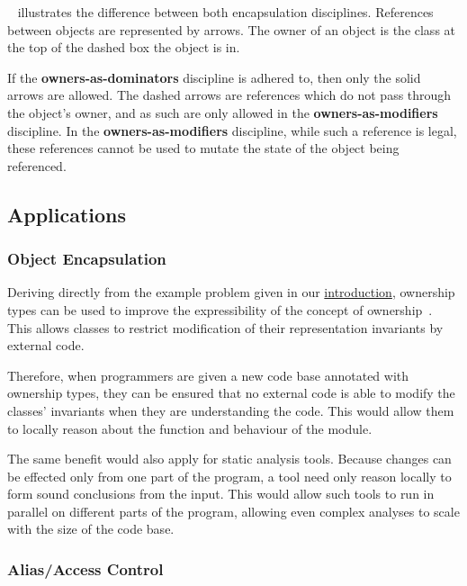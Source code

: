 \documentclass{acm_proc_article-sp}
\begin{document}
~\cite{dietl09gut} illustrates the
difference between both encapsulation disciplines. References between objects
are represented by arrows. The owner of an object is the class at the top of
the dashed box the object is in.

If the \textbf{owners-as-dominators} discipline is adhered to, then only the
solid arrows are allowed. The dashed arrows are references which do not pass
through the object's owner, and as such are only allowed in the
\textbf{owners-as-modifiers} discipline. In the \textbf{owners-as-modifiers}
discipline, while such a reference is legal, these references cannot be used to
mutate the state of the object being referenced.

\subsection{Applications}
\label{subsec:applications}

\subsubsection{Object Encapsulation}
\label{subsubsec:object_encapsulation}

Deriving directly from the example problem given in our
\hyperref[code:modular_reasoning_car_engine_1]{introduction}, ownership types
can be used to improve the expressibility of the concept of
ownership~\cite{clarke98ownership}. This allows classes to restrict
modification of their representation invariants by external code.

Therefore, when programmers are given a new code base annotated with ownership
types, they can be ensured that no external code is able to modify the classes'
invariants when they are understanding the code. This would allow them to
locally reason about the function and behaviour of the module.

The same benefit would also apply for static analysis tools. Because changes
can be effected only from one part of the program, a tool need only reason
locally to form sound conclusions from the input. This would allow such tools
to run in parallel on different parts of the program, allowing even complex
analyses to scale with the size of the code base.

\subsubsection{Alias/Access Control}
\label{subsubsec:alias_control}
\end{document}
